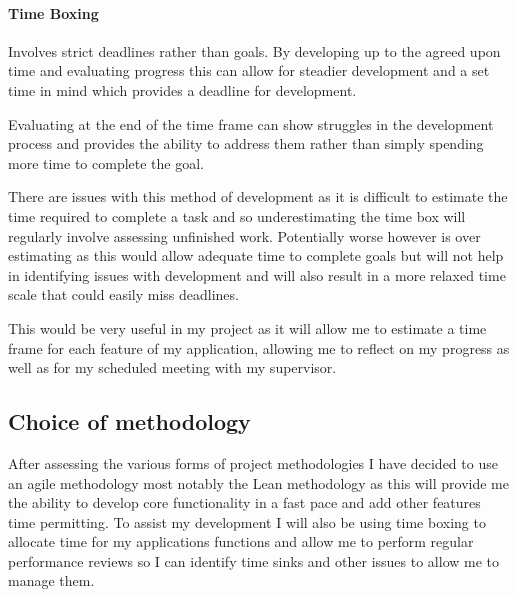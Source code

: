 \paragraph{Time Boxing}\label{time-boxing}

Involves strict deadlines rather than goals. By developing up to the
agreed upon time and evaluating progress this can allow for steadier
development and a set time in mind which provides a deadline for
development.

Evaluating at the end of the time frame can show struggles in the
development process and provides the ability to address them rather than
simply spending more time to complete the goal.

There are issues with this method of development as it is difficult to
estimate the time required to complete a task and so underestimating the
time box will regularly involve assessing unfinished work. Potentially
worse however is over estimating as this would allow adequate time to
complete goals but will not help in identifying issues with development
and will also result in a more relaxed time scale that could easily miss
deadlines.

This would be very useful in my project as it will allow me to estimate
a time frame for each feature of my application, allowing me to reflect
on my progress as well as for my scheduled meeting with my supervisor.

\subsection{Choice of methodology}\label{choice-of-methodology}

After assessing the various forms of project methodologies I have
decided to use an agile methodology most notably the Lean methodology as
this will provide me the ability to develop core functionality in a fast
pace and add other features time permitting. To assist my development I
will also be using time boxing to allocate time for my applications
functions and allow me to perform regular performance reviews so I can
identify time sinks and other issues to allow me to manage them.

